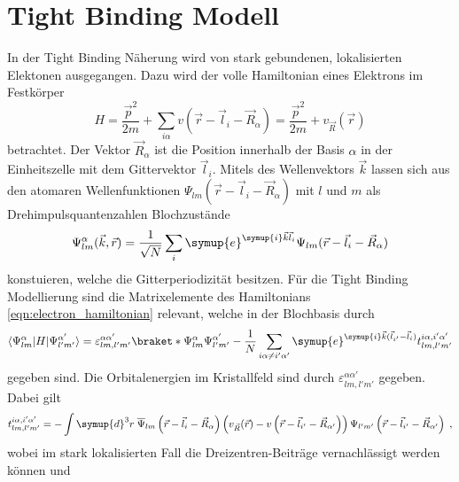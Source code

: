 \section{Tight Binding Modell}
\label{sec:tightbinding}
In der Tight Binding Näherung wird von stark gebundenen, lokalisierten Elektonen ausgegangen.\cite{Czycholl}
Dazu wird der volle Hamiltonian eines Elektrons im Festkörper
\begin{equation}
    H = \frac{\vec{p}^2}{2m} + \sum_{i\alpha} v(\vec{r}-\vec{l}_i - \vec{R}_{\alpha}) = \frac{\vec{p}^2}{2m} + v_{\vec{R}}(\vec{r})\label{eqn:electron_hamiltonian}
\end{equation}
betrachtet.\cite{Czycholl}
Der Vektor $\vec{R}_{\alpha}$ ist die Position innerhalb der Basis $\alpha$ in der Einheitszelle mit dem Gittervektor $\vec{l}_i$.
Mitels des Wellenvektors $\vec{k}$ lassen sich aus den atomaren Wellenfunktionen $\Psi_{lm} \left (\vec{r}-\vec{l}_i - \vec{R}_{\alpha} \right )$ mit $l$ und $m$ als Drehimpulsquantenzahlen
Blochzustände
\begin{equation}
    \Psi^{\alpha}_{lm}(\vec{k}, \vec{r}) = \frac{1}{\sqrt{N}} \sum_{i} \symup{e}^{\symup{i}\vec{k}\vec{l}_i} \Psi_{lm}(\vec{r}-\vec{l}_i - \vec{R}_{\alpha}) 
\end{equation}
konstuieren, welche die Gitterperiodizität besitzen.\cite{SC_literature}
Für die Tight Binding Modellierung sind die Matrixelemente des Hamiltonians \eqref{eqn:electron_hamiltonian}
relevant, welche in der Blochbasis durch
\begin{equation*}
    \bra{\Psi^{\alpha}_{lm}} H \ket{\Psi^{\alpha'}_{l'm'}} = \varepsilon_{lm,l'm'}^{\alpha \alpha'} \braket*{\Psi^{\alpha}_{lm}}{\Psi^{\alpha'}_{l'm'}}
    - \frac{1}{N} \sum_{i\alpha \neq i' \alpha'} \symup{e}^{\symup{i}\vec{k}(\vec{l}_{i'}-\vec{l}_{i})}  t^{i\alpha,i'\alpha'}_{lm,l'm'}
\end{equation*}
gegeben sind.\cite{SC_literature}\cite{Czycholl}
Die Orbitalenergien im Kristallfeld sind durch $\varepsilon_{lm,l'm'}^{\alpha \alpha'}$ gegeben.\cite{SC_literature}
Dabei gilt
\begin{equation*}
    t^{i\alpha,i'\alpha'}_{lm,l'm'} = - \int \symup{d}^3r \; \overline{\Psi}_{lm} \left (\vec{r}-\vec{l}_i - \vec{R}_{\alpha} \right ) 
    \left ( v_{\vec{R}} (\vec{r}) - v \left (\vec{r} - \vec{l}_{i'} - \vec{R}_{\alpha'} \right )   \right ) \Psi_{l'm'} \left (\vec{r}-\vec{l}_{i'} - \vec{R}_{\alpha'} \right )  \; ,
\end{equation*}
wobei im stark lokalisierten Fall die Dreizentren-Beiträge vernachlässigt werden können und  

